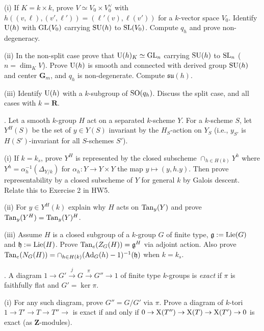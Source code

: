 \documentclass[10pt]{amsart}
\begin{document}
(i) If $K = k \times k$, prove $V \simeq V_0 \times V_0^{\vee}$ with $h((v, \ell),(v',\ell')) = 
(\ell'(v),\ell(v'))$ for a $k$-vector space $V_0$.
Identify ${\rm{U}}(h)$ with ${\rm{GL}}(V_0)$ carrying ${\rm{SU}}(h)$ to ${\rm{SL}}(V_0)$.
Compute $q_h$ and prove non-degeneracy. 

(ii) In the non-split case prove that ${\rm{U}}(h)_K \simeq {\rm{GL}}_n$ carrying
${\rm{SU}}(h)$ to ${\rm{SL}}_n$ ($n = \dim_K V$). 
Prove ${\rm{U}}(h)$ is smooth and connected
with derived group ${\rm{SU}}(h)$ and center $\mathbf{G}_m$, and $q_h$ is non-degenerate.
Compute $\mathfrak{su}(h)$.

(iii) Identify ${\rm{U}}(h)$ with a $k$-subgroup of ${\rm{SO}}(q_h)$.  Discuss the split case, and 
all cases with $k = \mathbf{R}$. 

\medskip{}. Let a smooth $k$-group $H$ act on a separated $k$-scheme $Y$.
For a $k$-scheme $S$, let 
$Y^H(S)$ be the set of $y \in Y(S)$ invariant by the $H_S$-action on $Y_S$
(i.e., $y_{S'}$ is $H(S')$-invariant for all $S$-schemes $S'$).

(i) If $k = k_s$, prove $Y^H$ is represented by 
the closed subscheme $\cap_{h \in H(k)} Y^h$
where $Y^h = \alpha_h^{-1}(\Delta_{Y/k})$ for $\alpha_h:Y \rightarrow Y \times Y$ the map $y \mapsto (y, h.y)$.
Then prove representability by a closed subscheme of $Y$ for general $k$ by Galois descent.
Relate this to Exercise 2 in HW5. 

(ii) For $y \in Y^H(k)$ explain why $H$ acts on ${\rm{Tan}}_y(Y)$ and prove
${\rm{Tan}}_y(Y^H) = {\rm{Tan}}_y(Y)^H$. 

(iii) Assume $H$ is a closed subgroup of a $k$-group $G$ of finite type, 
$\mathfrak{g} := {\rm{Lie}}(G)$ and $\mathfrak{h} := {\rm{Lie}}(H)$. 
Prove ${\rm{Tan}}_e(Z_G(H)) = \mathfrak{g}^H$ via adjoint action.  Also prove 
${\rm{Tan}}_e(N_G(H)) = \cap_{h \in H(k)} ({\rm{Ad}}_G(h) - 1)^{-1}(\mathfrak{h})$ when $k = k_s$.

\medskip{}. A diagram $1 \rightarrow G' \stackrel{j}{\rightarrow} G \stackrel{\pi}{\rightarrow} G'' \rightarrow 1$ of
finite type $k$-groups is {\em exact} if $\pi$ is faithfully flat and $G' = \ker \pi$.

(i)  For any such diagram, 
prove $G'' = G/G'$ via $\pi$.  Prove a diagram of $k$-tori
$1 \rightarrow T' \rightarrow T \rightarrow T'' \rightarrow$ is exact if and only if
$0 \rightarrow {\rm{X}}(T'') \rightarrow {\rm{X}}(T) \rightarrow {\rm{X}}(T') \rightarrow 0$ is exact
(as $\mathbf{Z}$-modules). 
\end{document}
